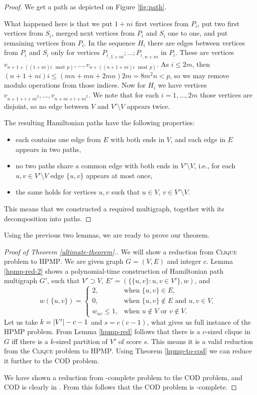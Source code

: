 \begin{proof}
We get a path as depicted on Figure \ref{fig:path}.

What happened here is that we put $1+ni$ first vertices from $P_i$,
put two first vertices from $S_i$, merged next vertices from $P_i$ and $S_i$ one to one,
and put remaining vertices from $P_i$.
In the sequence $H_i$ there are edges between vertices from $P_i$ and $S_i$
only for vertices ${P_i}_{,1+ni}; ...; {P_i}_{,n+ni}$ in $P_i$.
These are vertices $v_{n+1+((1+ni)i \mod p)}, ..., v_{n+((n+1+ni)i \mod p)} $.
As $i \leq 2m$, then $(n+1+ni)i \leq (mn+mn+2mn)2m = 8m^2 n < p$,
so we may remove modulo operations from those indices.
Now for $H_i$ we have vertices $v_{n+1+i+ni^2}, ..., v_{n+ni+i+ni^2}$.
We note that for each $i=1,...,2m$ those vertices are disjoint,
so no edge between $V$ and $V' \setminus V$ appears twice.

The resulting Hamiltonian paths have the following properties:
\begin{itemize}
\item each contains one edge from $E$ with both ends in $V$,
  and each edge in $E$ appears in two paths,
\item no two paths share a common edge with both ends in $V' \setminus V$,
  i.e., for each $u,v \in V' \setminus V$ edge $\{u,v\}$ appears at most once,
\item the same holds for vertices $u,v$ such that $u \in V$, $v \in V' \setminus V$.
\end{itemize}
This means that we constructed a required multigraph, together with its decomposition into paths.
\end{proof}

Using the previous two lemmas, we are ready to prove our theorem.

\begin{proof}[Proof of Theorem \ref{ultimate-theorem}.]
We will show a reduction from \textsc{Clique} problem to \textsc{HPMP}.
We are given graph $G = (V, E)$ and integer $c$.
Lemma \ref{hpmp-red-2} shows a polynomial-time construction of Hamiltonian path multigraph $G'$,
such that $V' \supset V$, $E'=(\{\{u,v\}: u,v \in V'\}, w)$, and
$$ w(\{u,v\}) =
\begin{cases}
2, 				&\text{when } \{u,v\} \in E ,\\
0, 				&\text{when } \{u,v\} \not\in E \text{ and } u,v \in V ,\\
w_{u v}\leq 1,	&\text{when } u \not\in V \text{ or } v \not\in V.
\end{cases}
$$
Let us take $k=\left\vert V' \right\vert-c-1$ and $s=c(c-1)$, what gives us full instance of the \textsc{HPMP} problem.
From Lemma \ref{hpmp-red} follows that there is a $c$-sized clique in $G$
iff there is a $k$-sized partition of $V'$ of score $s$.
This means it is a valid reduction from the \textsc{Clique} problem to \textsc{HPMP}.
Using Theorem \ref{hpmp-to-cod} we can reduce it further to the \textsc{COD} problem.

We have shown a reduction from \np-complete problem to the \textsc{COD} problem,
and \textsc{COD} is clearly in \np.
From this follows that the \textsc{COD} problem is \np-complete.
\end{proof}


